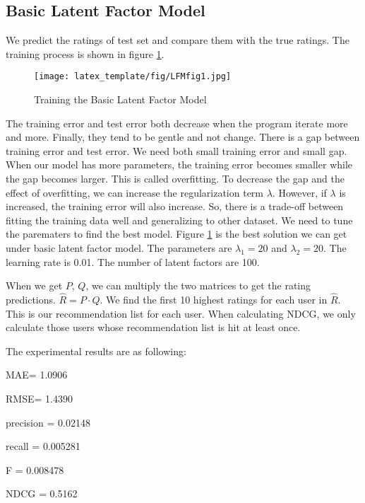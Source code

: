 \documentclass[sigconf]{acmart}
\begin{document}
\subsection{Basic Latent Factor Model}
\item{We predict the ratings of test set and compare them with the true ratings. The training process is shown in figure \ref{LFM1}.

\begin{figure}
    \centering
    \texttt{[image: latex\_template/fig/LFMfig1.jpg]}
    \caption{Training the Basic Latent Factor Model}
    \label{LFM1}
\end{figure}

The training error and test error both decrease when the program iterate more and more. Finally, they tend to be gentle and not change. There is a gap between training error and test error. We need both small training error and small gap. When our model has more parameters, the training error becomes smaller while the gap becomes larger. This is called overfitting. To decrease the gap and the effect of overfitting, we can increase the regularization term $\lambda$. However, if $\lambda$ is increased, the training error will also increase. So, there is a trade-off between fitting the training data well and generalizing to other dataset. We need to tune the parematers to find the best model. Figure \ref{LFM1} is the best solution we can get under basic latent factor model. The parameters are $\lambda_1 = 20$ and $\lambda_2 = 20$. The learning rate is 0.01. The number of latent factors are 100.

}

\item{
When we get $P$, $Q$, we can multiply the two matrices to get the rating predictions. $\hat{R} = P \cdot Q$. We find the first 10 highest ratings for each user in $\hat{R}$. This is our recommendation list for each user.
When calculating NDCG, we only calculate those users whose recommendation list is hit at least once.

}

\item{The experimental results are as following:}
\item{MAE= 1.0906}
\item{RMSE= 1.4390}
\item{precision = 0.02148}
\item{recall = 0.005281}
\item{F = 0.008478}
\item{NDCG = 0.5162}
\end{document}
